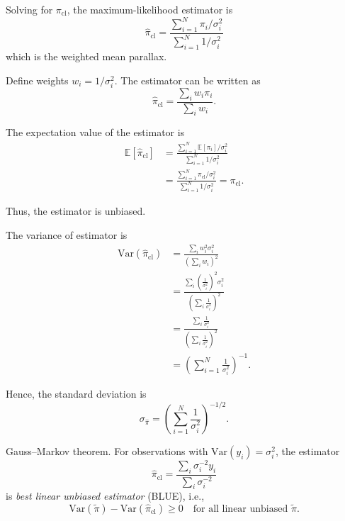 Solving for $\pi_{\mathrm{cl}}$, the maximum-likelihood estimator is
\begin{equation}
\hat{\pi}_{\mathrm{cl}}
=
\frac{\displaystyle \sum_{i=1}^N \pi_i / \sigma_i^2}
{\displaystyle \sum_{i=1}^N 1 / \sigma_i^2}
\end{equation}
which is the weighted mean parallax.

Define weights $w_i = 1/\sigma_i^2$.
The estimator can be written as
\begin{equation}
\hat{\pi}_{\mathrm{cl}} = \frac{\sum_i w_i \pi_i}{\sum_i w_i}.
\end{equation}

The expectation value of the estimator is
\begin{align}
\mathbb{E}[\hat{\pi}_{\mathrm{cl}}]
&=
\frac{\sum_{i=1}^N \mathbb{E}[\pi_i]/\sigma_i^2}
{\sum_{i=1}^N 1/\sigma_i^2} \\
&=
\frac{\sum_{i=1}^N \pi_{\mathrm{cl}}/\sigma_i^2}
{\sum_{i=1}^N 1/\sigma_i^2}
=
\pi_{\mathrm{cl}}.
\end{align}

Thus, the estimator is unbiased.


The variance of estimator is
\begin{align}
\mathrm{Var}(\hat{\pi}_{\mathrm{cl}})
&=
\frac{\sum_i w_i^2 \sigma_i^2}{\left(\sum_i w_i\right)^2} \\
&=
\frac{\sum_i \left(\frac{1}{\sigma_i^2}\right)^2 \sigma_i^2}{\left(\sum_i \frac{1}{\sigma_i^2}\right)^2} \\
&=
\frac{\sum_i \frac{1}{\sigma_i^2}}{\left(\sum_i \frac{1}{\sigma_i^2}\right)^2} \\
&=
\left( \sum_{i=1}^N \frac{1}{\sigma_i^2} \right)^{-1}.
\end{align}

Hence, the standard deviation is
\begin{equation}
\sigma_{\hat{\pi}} =
\left( \sum_{i=1}^N \frac{1}{\sigma_i^2} \right)^{-1/2}.
\end{equation}


\begin{notebox}[sharp corners, width=\textwidth]{Gauss--Markov theorem.}
For observations with $\mathrm{Var}(y_i)=\sigma_i^2$, the estimator
\[
\hat{\pi}_{\mathrm{cl}} = \frac{\sum_i \sigma_i^{-2} y_i}{\sum_i \sigma_i^{-2}}
\]
is \emph{best linear unbiased estimator} (BLUE), i.e.,
\[
\mathrm{Var}(\tilde{\pi}) - \mathrm{Var}(\hat{\pi}_{\mathrm{cl}}) \ge 0
\quad \text{for all linear unbiased } \tilde{\pi}.
\]
\end{notebox}


